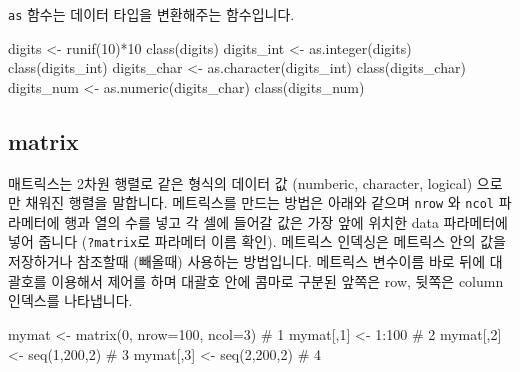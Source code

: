 \documentclass[
  a4paper,
]{book}
\newenvironment{Shaded}{\begin{snugshade}}{\end{snugshade}}
\newcommand{\AttributeTok}[1]{\textcolor[rgb]{0.40,0.45,0.13}{#1}}
\newcommand{\CommentTok}[1]{\textcolor[rgb]{0.37,0.37,0.37}{#1}}
\newcommand{\DecValTok}[1]{\textcolor[rgb]{0.68,0.00,0.00}{#1}}
\newcommand{\FunctionTok}[1]{\textcolor[rgb]{0.28,0.35,0.67}{#1}}
\newcommand{\NormalTok}[1]{\textcolor[rgb]{0.00,0.23,0.31}{#1}}
\newcommand{\OtherTok}[1]{\textcolor[rgb]{0.00,0.23,0.31}{#1}}
\newcommand{\SpecialCharTok}[1]{\textcolor[rgb]{0.37,0.37,0.37}{#1}}
\begin{document}
\texttt{as} 함수는 데이터 타입을 변환해주는 함수입니다.

\begin{Shaded}
\begin{Highlighting}[]
\NormalTok{digits }\OtherTok{\textless{}{-}} \FunctionTok{runif}\NormalTok{(}\DecValTok{10}\NormalTok{)}\SpecialCharTok{*}\DecValTok{10}
\FunctionTok{class}\NormalTok{(digits)}
\NormalTok{digits\_int }\OtherTok{\textless{}{-}} \FunctionTok{as.integer}\NormalTok{(digits)}
\FunctionTok{class}\NormalTok{(digits\_int)}
\NormalTok{digits\_char }\OtherTok{\textless{}{-}} \FunctionTok{as.character}\NormalTok{(digits\_int)}
\FunctionTok{class}\NormalTok{(digits\_char)}
\NormalTok{digits\_num }\OtherTok{\textless{}{-}} \FunctionTok{as.numeric}\NormalTok{(digits\_char)}
\FunctionTok{class}\NormalTok{(digits\_num)}
\end{Highlighting}
\end{Shaded}

\hypertarget{matrix}{%
\subsection{matrix}\label{matrix}}

매트릭스는 2차원 행렬로 같은 형식의 데이터 값 (numberic, character,
logical) 으로만 채워진 행렬을 말합니다. 메트릭스를 만드는 방법은 아래와
같으며 \texttt{nrow} 와 \texttt{ncol} 파라메터에 행과 열의 수를 넣고 각
셀에 들어갈 값은 가장 앞에 위치한 data 파라메터에 넣어 줍니다
(\texttt{?matrix}로 파라메터 이름 확인). 메트릭스 인덱싱은 메트릭스 안의
값을 저장하거나 참조할때 (빼올때) 사용하는 방법입니다. 메트릭스 변수이름
바로 뒤에 대괄호를 이용해서 제어를 하며 대괄호 안에 콤마로 구분된 앞쪽은
row, 뒷쪽은 column 인덱스를 나타냅니다.

\begin{Shaded}
\begin{Highlighting}[]
\NormalTok{mymat }\OtherTok{\textless{}{-}} \FunctionTok{matrix}\NormalTok{(}\DecValTok{0}\NormalTok{, }\AttributeTok{nrow=}\DecValTok{100}\NormalTok{, }\AttributeTok{ncol=}\DecValTok{3}\NormalTok{) }\CommentTok{\# 1}
\NormalTok{mymat[,}\DecValTok{1}\NormalTok{] }\OtherTok{\textless{}{-}} \DecValTok{1}\SpecialCharTok{:}\DecValTok{100} \CommentTok{\# 2}
\NormalTok{mymat[,}\DecValTok{2}\NormalTok{] }\OtherTok{\textless{}{-}} \FunctionTok{seq}\NormalTok{(}\DecValTok{1}\NormalTok{,}\DecValTok{200}\NormalTok{,}\DecValTok{2}\NormalTok{) }\CommentTok{\# 3}
\NormalTok{mymat[,}\DecValTok{3}\NormalTok{] }\OtherTok{\textless{}{-}} \FunctionTok{seq}\NormalTok{(}\DecValTok{2}\NormalTok{,}\DecValTok{200}\NormalTok{,}\DecValTok{2}\NormalTok{) }\CommentTok{\# 4}
\end{Highlighting}
\end{Shaded}
\end{document}
